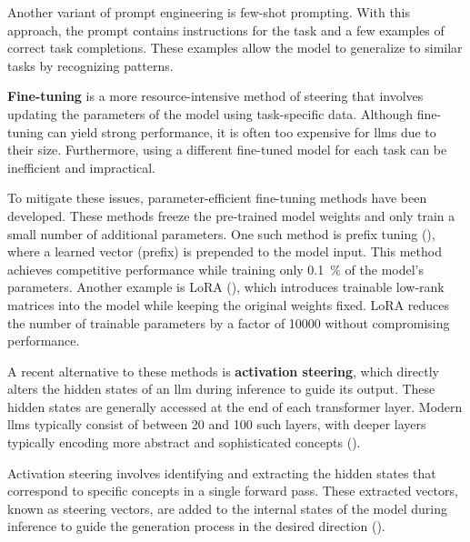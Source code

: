 Another variant of prompt engineering is few-shot prompting. With this approach, the prompt contains instructions for the task and a few examples of correct task completions. These examples allow the model to generalize to similar tasks by recognizing patterns.


\textbf{Fine-tuning} is a more resource-intensive method of steering that involves updating the parameters of the model using task-specific data. Although fine-tuning can yield strong performance, it is often too expensive for \acp{llm} due to their size. Furthermore, using a different fine-tuned model for each task can be inefficient and impractical.

To mitigate these issues, parameter-efficient fine-tuning methods have been developed. These methods freeze the pre-trained model weights and only train a small number of additional parameters. One such method is prefix tuning (\cite{liPrefixtuningOptimizingContinuous2021}), where a learned vector (prefix) is prepended to the model input. This method achieves competitive performance while training only \SI{0.1}{\percent} of the model's parameters. Another example is LoRA (\cite{huLoRALowrankAdaptation2021}), which introduces trainable low-rank matrices into the model while keeping the original weights fixed. LoRA reduces the number of trainable parameters by a factor of \num{10000} without compromising performance.


A recent alternative to these methods is \textbf{activation steering}, which directly alters the hidden states of an \acs{llm} during inference to guide its output. These hidden states are generally accessed at the end of each transformer layer. Modern \acp{llm} typically consist of between \num{20} and \num{100} such layers, with deeper layers typically encoding more abstract and sophisticated concepts (\cite{bogdanEmergentEffectsScaling2025}).

Activation steering involves identifying and extracting the hidden states that correspond to specific concepts in a single forward pass. These extracted vectors, known as steering vectors, are added to the internal states of the model during inference to guide the generation process in the desired direction (\cite{konenStyleVectorsSteering2024,turnerActivationAdditionSteering2024,subramaniExtractingLatentSteering2022}).
